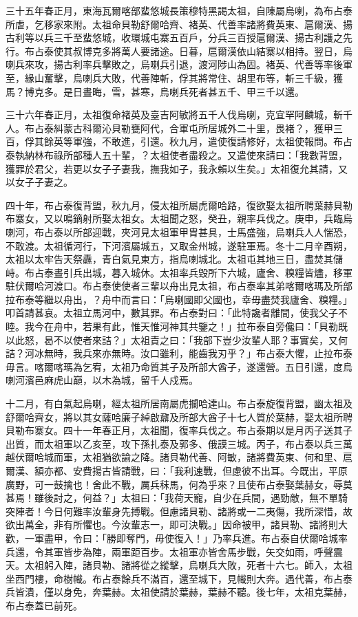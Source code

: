 \begin{pinyinscope}
三十五年春正月，東海瓦爾喀部蜚悠城長策穆特黑謁太祖，自陳屬烏喇，為布占泰所虐，乞移家來附。太祖命貝勒舒爾哈齊、褚英、代善率諸將費英東、扈爾漢、揚古利等以兵三千至蜚悠城，收環城屯寨五百戶，分兵三百授扈爾漢、揚古利護之先行。布占泰使其叔博克多將萬人要諸途。日暮，扈爾漢依山結寨以相持。翌日，烏喇兵來攻，揚古利率兵擊敗之，烏喇兵引退，渡河陟山為固。褚英、代善等率後軍至，緣山奮擊，烏喇兵大敗，代善陣斬，俘其將常住、胡里布等，斬三千級，獲馬？博克多。是日晝晦，雪，甚寒，烏喇兵死者甚五千、甲三千以還。

三十六年春正月，太祖復命褚英及臺吉阿敏將五千人伐烏喇，克宜罕阿麟城，斬千人。布占泰糾蒙古科爾沁貝勒甕阿代，合軍屯所居城外二十里，畏褚？，獲甲三百，俘其餘英等軍強，不敢進，引還。秋九月，遣使復請修好，太祖使報問。布占泰執納林布祿所部種人五十輩，？太祖使者盡殺之。又遣使來請曰：「我數背盟，獲罪於君父，若更以女子子妻我，撫我如子，我永賴以生矣。」太祖復允其請，又以女子子妻之。

四十年，布占泰復背盟，秋九月，侵太祖所屬虎爾哈路，復欲娶太祖所聘葉赫貝勒布寨女，又以鳴鏑射所娶太祖女。太祖聞之怒，癸丑，親率兵伐之。庚申，兵臨烏喇河，布占泰以所部迎戰，夾河見太祖軍甲胄甚具，士馬盛強，烏喇兵人人惴恐，不敢渡。太祖循河行，下河濱屬城五，又取金州城，遂駐軍焉。冬十二月辛酉朔，太祖以太牢告天祭纛，青白氣見東方，指烏喇城北。太祖屯其地三日，盡焚其儲峙。布占泰晝引兵出城，暮入城休。太祖率兵毀所下六城，廬舍、糗糧皆燼，移軍駐伏爾哈河渡口。布占泰使使者三輩以舟出見太祖，布占泰率其弟喀爾喀瑪及所部拉布泰等繼以舟出，？舟中而言曰：「烏喇國即父國也，幸毋盡焚我廬舍、糗糧。」叩首請甚哀。太祖立馬河中，數其罪。布占泰對曰：「此特讒者離間，使我父子不睦。我今在舟中，若果有此，惟天惟河神其共鑒之！」拉布泰自旁儳曰：「貝勒既以此怒，曷不以使者來詰？」太祖責之曰：「我部下豈少汝輩人耶？事實矣，又何詰？河冰無時，我兵來亦無時。汝口雖利，能齒我刃乎？」布占泰大懼，止拉布泰毋言。喀爾喀瑪為乞宥，太祖乃命質其子及所部大酋子，遂還營。五日引還，度烏喇河濱邑麻虎山巔，以木為城，留千人戍焉。

十二月，有白氣起烏喇，經太祖所居南屬虎攔哈達山。布占泰旋復背盟，幽太祖及舒爾哈齊女，將以其女薩哈廉子綽啟鼐及所部大酋子十七人質於葉赫，娶太祖所聘貝勒布寨女。四十一年春正月，太祖聞，復率兵伐之。布占泰期以是月丙子送其子出質，而太祖軍以乙亥至，攻下孫扎泰及郭多、俄謨三城。丙子，布占泰以兵三萬越伏爾哈城而軍，太祖猶欲諭之降。諸貝勒代善、阿敏，諸將費英東、何和里、扈爾漢、額亦都、安費揚古皆請戰，曰：「我利速戰，但慮彼不出耳。今既出，平原廣野，可一鼓擒也！舍此不戰，厲兵秣馬，何為乎來？且使布占泰娶葉赫女，辱莫甚焉！雖後討之，何益？」太祖曰：「我荷天寵，自少在兵間，遇勁敵，無不單騎突陣者！今日何難率汝輩身先搏戰。但慮諸貝勒、諸將或一二夷傷，我所深惜，故欲出萬全，非有所懼也。今汝輩志一，即可決戰。」因命被甲，諸貝勒、諸將則大歡，一軍盡甲，令曰：「勝即奪門，毋使復入！」乃率兵進。布占泰自伏爾哈城率兵還，令其軍皆步為陣，兩軍距百步。太祖軍亦皆舍馬步戰，矢交如雨，呼聲震天。太祖躬入陣，諸貝勒、諸將從之縱擊，烏喇兵大敗，死者十六七。師入，太祖坐西門樓，命樹幟。布占泰餘兵不滿百，還至城下，見幟則大奔。遇代善，布占泰兵皆潰，僅以身免，奔葉赫。太祖使請於葉赫，葉赫不聽。後七年，太祖克葉赫，布占泰蓋已前死。


\end{pinyinscope}
